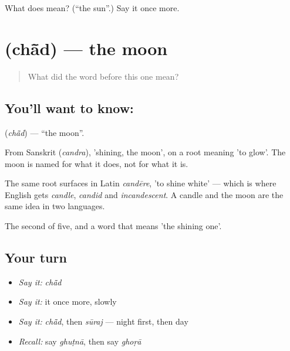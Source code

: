 \begin{tcolorbox}[breakable,colback=teal!4,colframe=teal!35!black,title={Before you move on}]
What does  mean? (\textquotedblleft{}the sun\textquotedblright{}.) Say it once more.
\end{tcolorbox}
\section[\texorpdfstring{\hi{चाँद} (chā̃d)}{चाँद (chā̃d)}]{ (chā̃d) — the moon}

\label{lesson:HI-C55-moon}



\begin{quote}
What did the word before this one mean?
\end{quote}

\subsection*{You'll want to know: }
\textbf{} (\emph{chā̃d}) — \textquotedblleft{}the moon\textquotedblright{}.

From Sanskrit  (\emph{candra}), 'shining, the moon', on a root meaning 'to glow'. The moon is named for what it does, not for what it is.

The same root surfaces in Latin \emph{candēre}, 'to shine white' — which is where English gets \emph{candle}, \emph{candid} and \emph{incandescent}. A candle and the moon are the same idea in two languages.

\begin{grammarlens}[title={What you've built}]
The second of five, and a word that means 'the shining one'.
\end{grammarlens}

\subsection*{Your turn}
\begin{itemize}
\raggedright
  \item \emph{Say it:} \emph{chā̃d}
  \item \emph{Say it:} it once more, slowly
  \item \emph{Say it:} \emph{chā̃d}, then \emph{sūraj} — night first, then day
  \item \emph{Recall:} say \emph{ghuṭnā}, then say \emph{ghoṛā}
\end{itemize}

